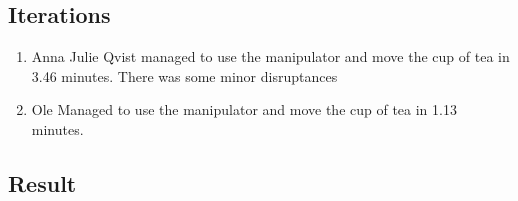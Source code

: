 \subsection*{Iterations}
\begin{enumerate}
    \item Anna Julie Qvist managed to use the manipulator and move the cup of tea in 3.46 minutes. There was some minor disruptances 
    \item Ole Managed to use the manipulator and move the cup of tea in 1.13 minutes.
\end{enumerate}
\subsection*{Result}


